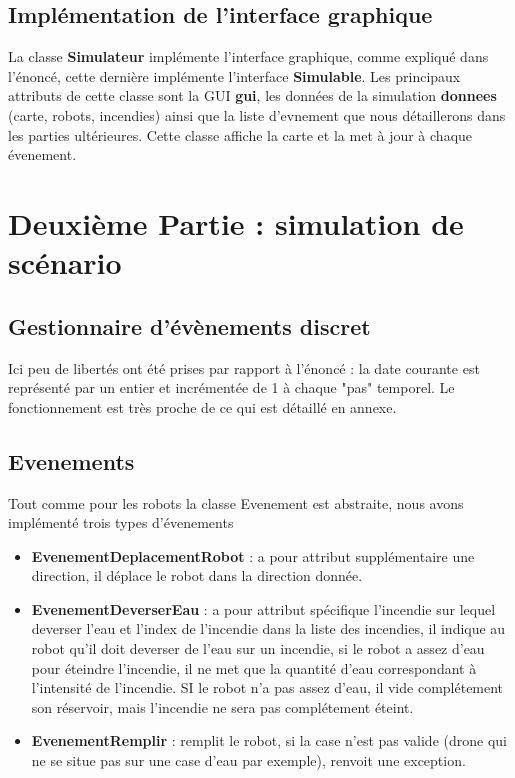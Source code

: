 \documentclass{article}
\begin{document}
\subsection{Implémentation de l'interface graphique} 

La classe \textbf{Simulateur} implémente l'interface graphique, comme expliqué dans l'énoncé, cette dernière implémente l'interface \textbf{Simulable}. Les principaux attributs de cette classe sont la GUI \textbf{gui}, les données de la simulation \textbf{donnees} (carte, robots, incendies) ainsi que la liste d'evnement que nous détaillerons dans les parties ultérieures. Cette classe affiche la carte et la met à jour à chaque évenement.

\section{Deuxième Partie : simulation de scénario}

\subsection{Gestionnaire d'évènements discret}

Ici peu de libertés ont été prises par rapport à l'énoncé : la date courante est représenté par un entier et incrémentée de 1 à chaque "pas" temporel. Le fonctionnement est très proche de ce qui est détaillé en annexe. 

\subsection{Evenements} 

Tout comme pour les robots la classe Evenement est abstraite, nous avons implémenté trois types d'évenements 
\begin{itemize}
    \item \textbf{EvenementDeplacementRobot} : a pour attribut supplémentaire une direction, il déplace le robot dans la direction donnée.  
    \item \textbf{EvenementDeverserEau} : a pour attribut spécifique l'incendie sur lequel deverser l'eau et l'index de l'incendie dans la liste des incendies, il indique au robot qu'il doit deverser de l'eau sur un incendie, si le robot a assez d'eau pour éteindre l'incendie, il ne met que la quantité d'eau correspondant à l'intensité de l'incendie. SI le robot n'a pas assez d'eau, il vide complétement son réservoir, mais l'incendie ne sera pas complétement éteint.
    \item \textbf{EvenementRemplir} : remplit le robot, si la case n'est pas valide (drone qui ne se situe pas sur une case d'eau par exemple), renvoit une exception. 
\end{itemize}
\end{document}
